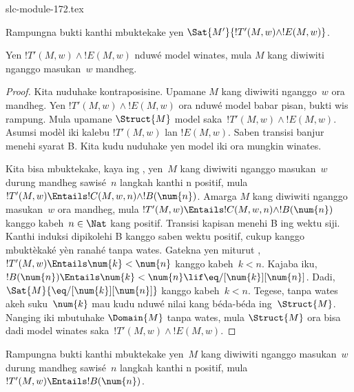 \begin{filecontents*}[overwrite]{slc-module-172.tex}
\begin{prob}
  Rampungna bukti 
  kanthi mbuktekake yen
  $\Sat{M'}{!T'(M,w) \land !E(M,w)}$.
\end{prob}

\begin{lem}
  Yen $!T'(M,w) \land !E(M,w)$ nduwé model winates,
  mula $M$ kang diwiwiti nganggo masukan~$w$ mandheg.
\end{lem}

\begin{proof}
  Kita nuduhake kontraposisine. Upamane $M$ kang
  diwiwiti nganggo~$w$ ora mandheg. Yen
  $!T'(M,w) \land !E(M,w)$ ora nduwé model babar pisan,
  bukti wis rampung. Mula upamane $\Struct{M}$
  model saka~$!T'(M,w) \land !E(M, w)$. Asumsi modèl iki kalebu $!T'(M,w)$ lan $!E(M,w)$. Saben transisi banjur menehi syarat B.
  Kita kudu nuduhake yen model iki ora mungkin winates.
  
  Kita bisa mbuktekake, kaya ing
  , yen~$M$ kang diwiwiti
  nganggo masukan~$w$ durung mandheg sawisé~$n$
  langkah kanthi n positif, mula $!T'(M,w) \Entails !C(M, w, n)
  \land !B(\num{n})$. Amarga $M$ kang diwiwiti
  nganggo masukan~$w$ ora mandheg, mula
  $!T'(M,w) \Entails !C(M, w, n) \land
  !B(\num{n})$ kanggo kabeh~$n \in \Nat$ kang positif. Transisi kapisan menehi B ing wektu siji. Kanthi induksi dipikolehi B kanggo saben wektu positif, cukup kanggo mbuktèkaké yèn ranahé tanpa wates.
  Gatekna yen miturut ,
  $!T'(M,w) \Entails \num{k} < \num{n}$
  kanggo kabeh~$k < n$. Kajaba iku,
  $!B(\num{n}) \Entails \num{k} < \num{n} \lif
  \eq/[\num{k}][\num{n}]$. Dadi,
  $\Sat{M}{\eq/[\num{k}][\num{n}]}$ kanggo
  kabeh~$k < n$. Tegese, tanpa wates akeh
  suku~$\num{k}$ mau kudu nduwé nilai kang
  béda-béda ing~$\Struct{M}$. Nanging iki
  mbutuhake $\Domain{M}$ tanpa wates, mula
  $\Struct{M}$ ora bisa dadi model winates
  saka~$!T'(M,w) \land !E(M, w)$.
\end{proof}

\begin{prob}
  Rampungna bukti 
  kanthi mbuktekake yen~$M$ kang diwiwiti
  nganggo masukan~$w$ durung mandheg sawisé~$n$
  langkah kanthi n positif, mula $!T'(M,w) \Entails !B(\num{n})$.
\end{prob}


\end{filecontents*}
